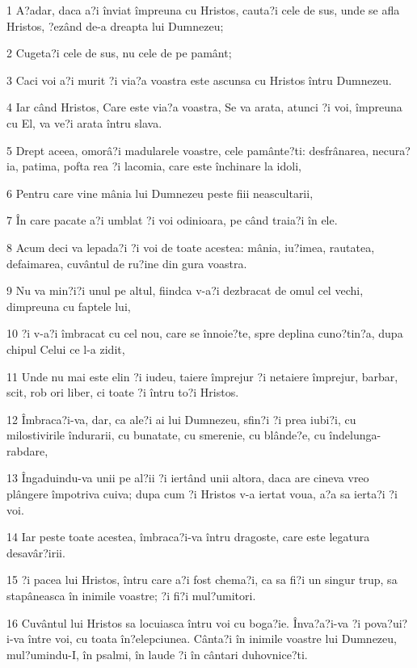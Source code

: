 \par 1 A?adar, daca a?i înviat împreuna cu Hristos, cauta?i cele de sus, unde se afla Hristos, ?ezând de-a dreapta lui Dumnezeu;
\par 2 Cugeta?i cele de sus, nu cele de pe pamânt;
\par 3 Caci voi a?i murit ?i via?a voastra este ascunsa cu Hristos întru Dumnezeu.
\par 4 Iar când Hristos, Care este via?a voastra, Se va arata, atunci ?i voi, împreuna cu El, va ve?i arata întru slava.
\par 5 Drept aceea, omorâ?i madularele voastre, cele pamânte?ti: desfrânarea, necura?ia, patima, pofta rea ?i lacomia, care este închinare la idoli,
\par 6 Pentru care vine mânia lui Dumnezeu peste fiii neascultarii,
\par 7 În care pacate a?i umblat ?i voi odinioara, pe când traia?i în ele.
\par 8 Acum deci va lepada?i ?i voi de toate acestea: mânia, iu?imea, rautatea, defaimarea, cuvântul de ru?ine din gura voastra.
\par 9 Nu va min?i?i unul pe altul, fiindca v-a?i dezbracat de omul cel vechi, dimpreuna cu faptele lui,
\par 10 ?i v-a?i îmbracat cu cel nou, care se înnoie?te, spre deplina cuno?tin?a, dupa chipul Celui ce l-a zidit,
\par 11 Unde nu mai este elin ?i iudeu, taiere împrejur ?i netaiere împrejur, barbar, scit, rob ori liber, ci toate ?i întru to?i Hristos.
\par 12 Îmbraca?i-va, dar, ca ale?i ai lui Dumnezeu, sfin?i ?i prea iubi?i, cu milostivirile îndurarii, cu bunatate, cu smerenie, cu blânde?e, cu îndelunga-rabdare,
\par 13 Îngaduindu-va unii pe al?ii ?i iertând unii altora, daca are cineva vreo plângere împotriva cuiva; dupa cum ?i Hristos v-a iertat voua, a?a sa ierta?i ?i voi.
\par 14 Iar peste toate acestea, îmbraca?i-va întru dragoste, care este legatura desavâr?irii.
\par 15 ?i pacea lui Hristos, întru care a?i fost chema?i, ca sa fi?i un singur trup, sa stapâneasca în inimile voastre; ?i fi?i mul?umitori.
\par 16 Cuvântul lui Hristos sa locuiasca întru voi cu boga?ie. Înva?a?i-va ?i pova?ui?i-va între voi, cu toata în?elepciunea. Cânta?i în inimile voastre lui Dumnezeu, mul?umindu-I, în psalmi, în laude ?i în cântari duhovnice?ti.

